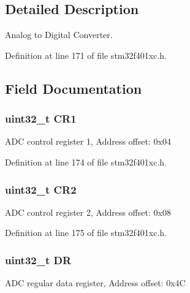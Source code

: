\subsection{Detailed Description}
Analog to Digital Converter. 

Definition at line 171 of file stm32f401xc.\+h.



\subsection{Field Documentation}
\subsubsection[{\texorpdfstring{C\+R1}{CR1}}]{ uint32\+\_\+t C\+R1}\hypertarget{struct_a_d_c___type_def_ab0ec7102960640751d44e92ddac994f0}{}\label{struct_a_d_c___type_def_ab0ec7102960640751d44e92ddac994f0}
A\+DC control register 1, Address offset\+: 0x04 

Definition at line 174 of file stm32f401xc.\+h.

\subsubsection[{\texorpdfstring{C\+R2}{CR2}}]{ uint32\+\_\+t C\+R2}\hypertarget{struct_a_d_c___type_def_afdfa307571967afb1d97943e982b6586}{}\label{struct_a_d_c___type_def_afdfa307571967afb1d97943e982b6586}
A\+DC control register 2, Address offset\+: 0x08 

Definition at line 175 of file stm32f401xc.\+h.

\subsubsection[{\texorpdfstring{DR}{DR}}]{ uint32\+\_\+t DR}\hypertarget{struct_a_d_c___type_def_a3df0d8dfcd1ec958659ffe21eb64fa94}{}\label{struct_a_d_c___type_def_a3df0d8dfcd1ec958659ffe21eb64fa94}
A\+DC regular data register, Address offset\+: 0x4C 

